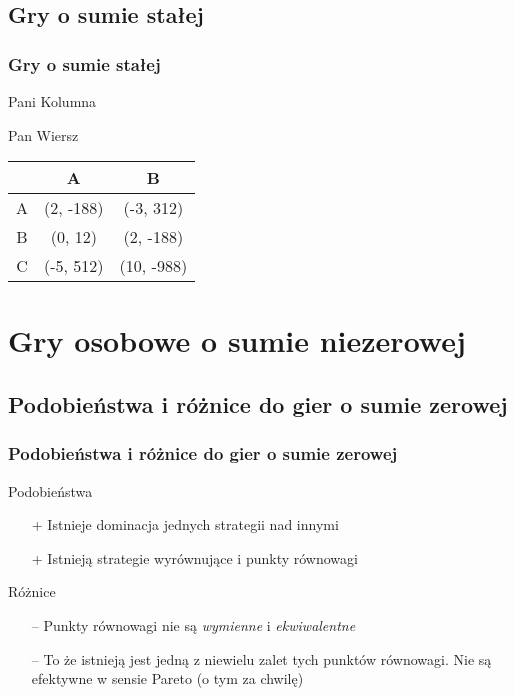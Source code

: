 \documentclass[8pt, brown]{beamer}
\begin{document}
		\subsection{Gry o sumie stałej}
		\begin{frame}
			\frametitle{Gry o sumie stałej}
			\begin{center}
				Pani Kolumna
			\end{center}
				\hspace{1.6cm}Pan Wiersz
				\begin{tabular}{c|cc}
					  & A  & B   \\ \hline
					A & (2, -188)  & (-3, 312)  \\
					B & (0, 12)  & (2, -188)   \\
					C & (-5, 512) & (10, -988)  \\
				\end{tabular}
		\end{frame}

	\section{Gry osobowe o sumie niezerowej}
		\subsection{Podobieństwa i różnice do gier o sumie zerowej}
		\begin{frame}
			\frametitle{Podobieństwa i różnice do gier o sumie zerowej}
			\begin{center}
				\LARGE\color{darkmagenta}Podobieństwa
			\end{center}
			\begin{itemize}
				\item[+] Istnieje dominacja jednych strategii nad innymi
				\item[+] Istnieją strategie wyrównujące i punkty równowagi
			 \end{itemize}
			 
			\begin{center}
				\LARGE\color{darkmagenta}Różnice
			\end{center}
			\begin{itemize}
				\item[--] Punkty równowagi nie są \textit{wymienne} i \textit{ekwiwalentne}
				\item[--] To że istnieją jest jedną z niewielu zalet tych punktów równowagi. Nie są efektywne w sensie Pareto (o tym za chwilę)
			\end{itemize}
		\end{frame}
		
\end{document}
